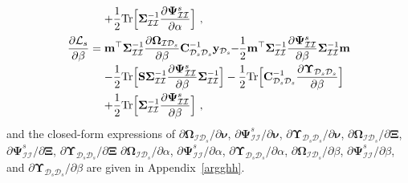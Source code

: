 \documentclass[conference]{IEEEtran}
\begin{document}
\begin{equation*}
\begin{array}{l}
				\displaystyle\qquad\quad\;+\frac{1}{2}\mathrm{Tr}\Big[\mathbf{\Sigma}_\mathcal{II}^{-1}\dfrac{\partial\mathbf{\Psi}_\mathcal{II}^{s}}{\partial \alpha}\Big]\vspace{2mm}\ ,\\
				\displaystyle\dfrac{\partial{\mathcal{L}}_s}{\partial \beta}=\mathbf{m}^\top\mathbf{\Sigma}_\mathcal{II}^{-1}\dfrac{\partial\mathbf{\Omega}_{\mathcal{I}\mathcal{D}_s}}{\partial \beta}\mathbf{C}_{\mathcal{D}_s\mathcal{D}_s}^{-1}\mathbf{y}_{\mathcal{D}_s}\hspace{-1mm}-\hspace{-1mm}\frac{1}{2}\mathbf{m}^\top\mathbf{\Sigma}_\mathcal{II}^{-1}\dfrac{\partial\mathbf{\Psi}_\mathcal{II}^{s}}{\partial \beta}\mathbf{\Sigma}_\mathcal{II}^{-1}\mathbf{m}\vspace{1mm} \\
				\displaystyle\qquad\quad\;-\frac{1}{2}\mathrm{Tr}\Big[\mathbf{S}\mathbf{\Sigma}_\mathcal{II}^{-1}\dfrac{\partial\mathbf{\Psi}_\mathcal{II}^{s}}{\partial \beta}\mathbf{\Sigma}_\mathcal{II}^{-1}\Big]- \frac{1}{2}\mathrm{Tr}\Big[\mathbf{C}_{\mathcal{D}_s\mathcal{D}_s}^{-1}\dfrac{\partial\mathbf{\Upsilon}_{\mathcal{D}_s\mathcal{D}_s}}{\partial \beta}\Big]\vspace{1mm}\\ \displaystyle\qquad\quad\;+\frac{1}{2}\mathrm{Tr}\Big[\mathbf{\Sigma}_\mathcal{II}^{-1}\dfrac{\partial\mathbf{\Psi}_\mathcal{II}^{s}}{\partial \beta}\Big]\ ,
			\end{array}
		\end{equation*}	
and the closed-form expressions of $\partial\mathbf{\Omega}_{\mathcal{I}\mathcal{D}_s}/\partial\boldsymbol{\nu}$, $\partial\mathbf{\Psi}_\mathcal{II}^{s}/\partial\boldsymbol{\nu}$, $\partial\mathbf{\Upsilon}_{\mathcal{D}_s\mathcal{D}_s}/\partial\boldsymbol{\nu}$, $\partial\mathbf{\Omega}_{\mathcal{I}\mathcal{D}_s}/\partial\mathbf{\Xi}$, $\partial\mathbf{\Psi}_\mathcal{II}^{s}/\partial\mathbf{\Xi}$,  $\partial\mathbf{\Upsilon}_{\mathcal{D}_s\mathcal{D}_s}/\partial\mathbf{\Xi}$ $\partial\mathbf{\Omega}_{\mathcal{I}\mathcal{D}_s}/\partial \alpha$, $\partial\mathbf{\Psi}_\mathcal{II}^{s}/\partial \alpha$, $\partial\mathbf{\Upsilon}_{\mathcal{D}_s\mathcal{D}_s}/\partial \alpha$, $\partial\mathbf{\Omega}_{\mathcal{I}\mathcal{D}_s}/\partial \beta$, $\partial\mathbf{\Psi}_\mathcal{II}^{s}/\partial \beta$, and $\partial\mathbf{\Upsilon}_{\mathcal{D}_s\mathcal{D}_s}/\partial \beta$ are given in Appendix~\ref{argghh}.
%	
\end{document}
